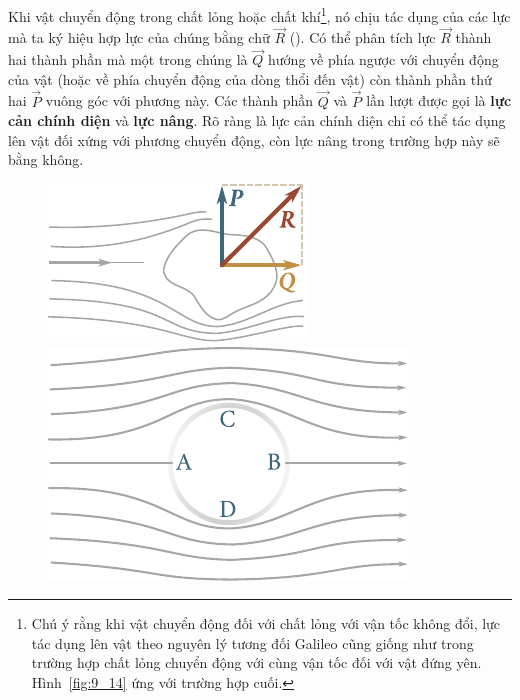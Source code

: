 Khi vật chuyển động trong chất lỏng hoặc chất khí\footnote{Chú ý rằng khi vật chuyển động đối với chất lỏng với vận tốc không đổi, lực tác dụng lên vật theo nguyên lý tương đối Galileo cũng giống như trong trường hợp chất lỏng chuyển động với cùng vận tốc đối với vật đứng yên. Hình~\ref{fig:9_14} ứng với trường hợp cuối.}, nó chịu tác dụng của các lực mà ta ký hiệu hợp lực của chúng bằng chữ $\vec{R}$ (). Có thể phân tích lực $\vec{R}$ thành hai thành phần mà một trong chúng là $\vec{Q}$ hướng về phía ngược với chuyển động của vật (hoặc về phía chuyển động của dòng thổi đến vật) còn thành phần thứ hai $\vec{P}$ vuông góc với phương này. Các thành phần $\vec{Q}$ và $\vec{P}$ lần lượt được gọi là \textbf{lực cản chính diện} và \textbf{lực nâng}. Rõ ràng là lực cản chính diện chỉ có thể tác dụng lên vật đối xứng với phương chuyển động, còn lực nâng trong trường hợp này sẽ bằng không.

\begin{figure}[!htb]
	\begin{minipage}[t]{0.4\linewidth}
		\begin{center}
			\includegraphics[scale=1.0]{figures/ch_09/fig_9_14.pdf}
			\caption[]{}
			\label{fig:9_14}
		\end{center}
	\end{minipage}
	\hspace{-0.0cm}
	\begin{minipage}[t]{0.6\linewidth}
		\begin{center}
			\includegraphics[scale=1.0]{figures/ch_09/fig_9_15.pdf}
			\caption[]{}
			\label{fig:9_15}
		\end{center}
	\end{minipage}
	\vspace{-0.4cm}
\end{figure}

